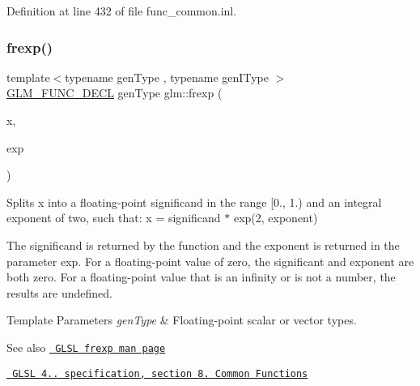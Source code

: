 Definition at line 432 of file func\+\_\+common.\+inl.

\mbox{\label{group__core__func__common_ga20620e83544d1a988857a3bc4ebe0e1d}} 
\subsubsection{\texorpdfstring{frexp()}{frexp()}}
{\footnotesize\ttfamily template$<$typename gen\+Type , typename gen\+I\+Type $>$ \\
\mbox{\hyperlink{setup_8hpp_ab2d052de21a70539923e9bcbf6e83a51}{G\+L\+M\+\_\+\+F\+U\+N\+C\+\_\+\+D\+E\+CL}} gen\+Type glm\+::frexp (\begin{DoxyParamCaption}\item[{gen\+Type const \&}]{x,  }\item[{gen\+I\+Type \&}]{exp }\end{DoxyParamCaption})}

Splits x into a floating-\/point significand in the range \mbox{[}0., 1.) and an integral exponent of two, such that\+: x = significand $\ast$ exp(2, exponent)

The significand is returned by the function and the exponent is returned in the parameter exp. For a floating-\/point value of zero, the significant and exponent are both zero. For a floating-\/point value that is an infinity or is not a number, the results are undefined.


\begin{DoxyTemplParams}{Template Parameters}
{\em gen\+Type} & Floating-\/point scalar or vector types.\\
\hline
\end{DoxyTemplParams}
\begin{DoxySeeAlso}{See also}
\href{http://www.opengl.org/sdk/docs/manglsl/xhtml/frexp.xml}{\texttt{ G\+L\+SL frexp man page}} 

\href{http://www.opengl.org/registry/doc/GLSLangSpec.4.20.8.pdf}{\texttt{ G\+L\+SL 4.. specification, section 8. Common Functions}} 
\end{DoxySeeAlso}
\mbox{\label{group__core__func__common_ga2650dc57b2148a6ffbce20944fb4d97a}} 
